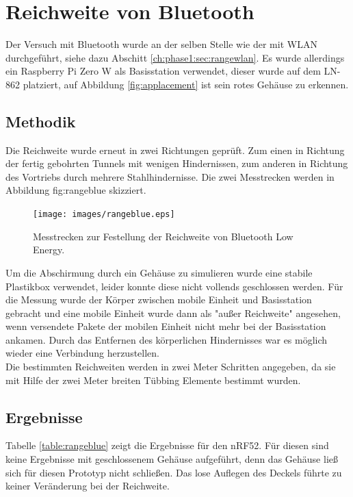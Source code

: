 \section{Reichweite von Bluetooth}
Der Versuch mit Bluetooth wurde an der selben Stelle wie der mit WLAN durchgeführt, siehe dazu Abschitt \ref{ch:phase1:sec:rangewlan}.
Es wurde allerdings ein Raspberry Pi Zero W als Basisstation verwendet, dieser wurde auf dem LN-862 platziert, auf Abbildung \ref{fig:applacement} ist sein rotes Gehäuse zu erkennen.

\subsection{Methodik}
Die Reichweite wurde erneut in zwei Richtungen geprüft. 
Zum einen in Richtung der fertig gebohrten Tunnels mit wenigen Hindernissen, zum anderen in Richtung des Vortriebs durch mehrere Stahlhindernisse.
Die zwei Messtrecken werden in Abbildung {fig:rangeblue} skizziert.

\begin{figure}[h!]
  \centering
	\texttt{[image: images/rangeblue.eps]}
  \caption{Messtrecken zur Festellung der Reichweite von Bluetooth Low Energy.}
  \label{fig:rangeblue}
\end{figure}

Um die Abschirmung durch ein Gehäuse zu simulieren wurde eine stabile Plastikbox verwendet, leider konnte diese nicht vollends geschlossen werden.
Für die Messung wurde der Körper zwischen mobile Einheit und Basisstation gebracht und eine mobile Einheit wurde dann als "außer Reichweite" angesehen, wenn versendete Pakete der mobilen Einheit nicht mehr bei der Basisstation ankamen.
Durch das Entfernen des körperlichen Hindernisses war es möglich wieder eine Verbindung herzustellen.\\
Die bestimmten Reichweiten werden in zwei Meter Schritten angegeben, da sie mit Hilfe der zwei Meter breiten Tübbing Elemente bestimmt wurden.

\subsection{Ergebnisse}
Tabelle \ref{table:rangeblue} zeigt die Ergebnisse für den nRF52.
Für diesen sind keine Ergebnisse mit geschlossenem Gehäuse aufgeführt, denn das Gehäuse ließ sich für diesen Prototyp nicht schließen.
Das lose Auflegen des Deckels führte zu keiner Veränderung bei der Reichweite.

